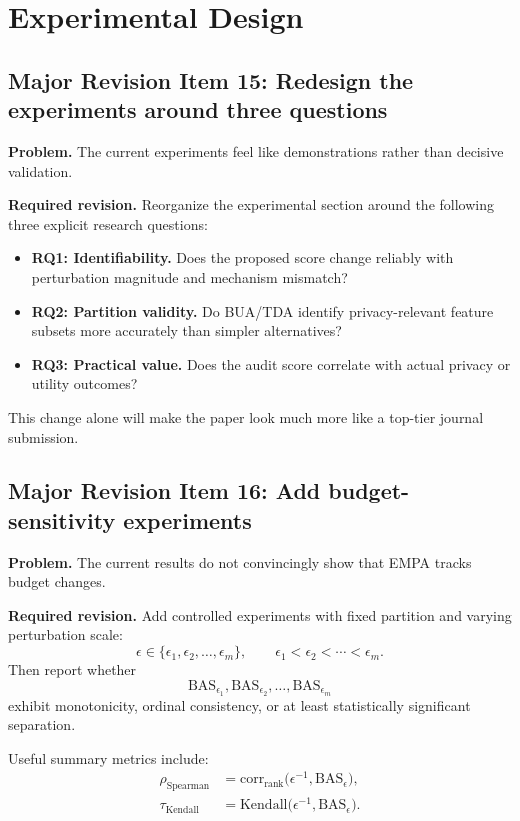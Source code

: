 \section{Experimental Design}

\subsection*{Major Revision Item 15: Redesign the experiments around three questions}
\textbf{Problem.} The current experiments feel like demonstrations rather than decisive validation.

\textbf{Required revision.}
Reorganize the experimental section around the following three explicit research questions:

\begin{itemize}
    \item \textbf{RQ1: Identifiability.} Does the proposed score change reliably with perturbation magnitude and mechanism mismatch?
    \item \textbf{RQ2: Partition validity.} Do BUA/TDA identify privacy-relevant feature subsets more accurately than simpler alternatives?
    \item \textbf{RQ3: Practical value.} Does the audit score correlate with actual privacy or utility outcomes?
\end{itemize}

This change alone will make the paper look much more like a top-tier journal submission.

\subsection*{Major Revision Item 16: Add budget-sensitivity experiments}
\textbf{Problem.} The current results do not convincingly show that EMPA tracks budget changes.

\textbf{Required revision.}
Add controlled experiments with fixed partition and varying perturbation scale:
\[
\epsilon \in \{ \epsilon_1, \epsilon_2, \ldots, \epsilon_m \},
\qquad
\epsilon_1 < \epsilon_2 < \cdots < \epsilon_m.
\]
Then report whether
\[
\mathrm{BAS}_{\epsilon_1}, \mathrm{BAS}_{\epsilon_2}, \ldots, \mathrm{BAS}_{\epsilon_m}
\]
exhibit monotonicity, ordinal consistency, or at least statistically significant separation.

Useful summary metrics include:
\begin{align}
\rho_{\mathrm{Spearman}}
&=
\mathrm{corr}_{\mathrm{rank}}
\bigl(
\epsilon^{-1},
\mathrm{BAS}_\epsilon
\bigr), \\
\tau_{\mathrm{Kendall}}
&=
\mathrm{Kendall}
\bigl(
\epsilon^{-1},
\mathrm{BAS}_\epsilon
\bigr).
\end{align}

